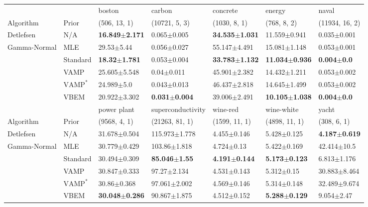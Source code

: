 \begin{tabular}{lllllll}
\toprule
             &      &                     boston &                    carbon &                   concrete &                     energy &                   naval \\
Algorithm & Prior& (506, 13, 1)& (10721, 5, 3)& (1030, 8, 1)& (768, 8, 2)& (11934, 16, 2)\\
\midrule
Detlefsen & N/A &  \textbf{16.849$\pm$2.171} &           0.065$\pm$0.005 &  \textbf{34.535$\pm$1.031} &           11.559$\pm$0.941 &         0.035$\pm$0.001 \\
Gamma-Normal & MLE &             29.53$\pm$5.44 &           0.056$\pm$0.027 &           55.147$\pm$4.491 &           15.081$\pm$1.148 &         0.053$\pm$0.001 \\
             & Standard &   \textbf{18.32$\pm$1.781} &           0.053$\pm$0.004 &  \textbf{33.783$\pm$1.132} &  \textbf{11.034$\pm$0.936} &  \textbf{0.004$\pm$0.0} \\
             & VAMP &           25.605$\pm$5.548 &            0.04$\pm$0.011 &           45.901$\pm$2.382 &           14.432$\pm$1.211 &         0.053$\pm$0.002 \\
             & $\text{VAMP}^*$ &             24.989$\pm$5.0 &           0.043$\pm$0.013 &           46.437$\pm$2.818 &           14.645$\pm$1.499 &         0.053$\pm$0.002 \\
             & VBEM &           20.922$\pm$3.302 &  \textbf{0.031$\pm$0.004} &           39.006$\pm$2.491 &  \textbf{10.105$\pm$1.038} &  \textbf{0.004$\pm$0.0} \\
\midrule
             &      &                power plant &         superconductivity &                  wine-red &                wine-white &                     yacht \\
Algorithm & Prior& (9568, 4, 1)& (21263, 81, 1)& (1599, 11, 1)& (4898, 11, 1)& (308, 6, 1)\\
\midrule
Detlefsen & N/A &           31.678$\pm$0.504 &         115.973$\pm$1.778 &           4.455$\pm$0.146 &           5.428$\pm$0.125 &  \textbf{4.187$\pm$0.619} \\
Gamma-Normal & MLE &           30.779$\pm$0.429 &          103.86$\pm$1.818 &            4.724$\pm$0.13 &           5.422$\pm$0.169 &           42.414$\pm$10.5 \\
             & Standard &           30.494$\pm$0.309 &  \textbf{85.046$\pm$1.55} &  \textbf{4.191$\pm$0.144} &  \textbf{5.173$\pm$0.123} &           6.813$\pm$1.176 \\
             & VAMP &           30.847$\pm$0.333 &           97.27$\pm$2.134 &           4.531$\pm$0.143 &            5.312$\pm$0.15 &          30.883$\pm$8.464 \\
             & $\text{VAMP}^*$ &            30.86$\pm$0.368 &          97.061$\pm$2.002 &           4.569$\pm$0.146 &           5.314$\pm$0.148 &          32.489$\pm$9.674 \\
             & VBEM &  \textbf{30.048$\pm$0.286} &          90.867$\pm$1.875 &           4.512$\pm$0.152 &  \textbf{5.288$\pm$0.129} &            9.054$\pm$2.47 \\
\bottomrule
\end{tabular}


